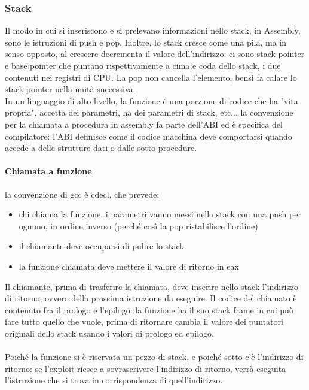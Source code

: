 \documentclass{article}
\begin{document}
\subsubsection{Stack}
Il modo in cui si inseriscono e si prelevano informazioni nello stack, in Assembly, sono le istruzioni di push e pop. Inoltre, lo stack cresce come una pila, ma in senso opposto, al crescere decrementa il valore dell'indirizzo: ci sono stack pointer e base pointer che puntano rispettivamente a cima e coda dello stack, i due contenuti nei registri di CPU. La pop non cancella l'elemento, bensì fa calare lo stack pointer nella unità successiva.\\ In un linguaggio di alto livello, la funzione è una porzione di codice che ha "vita propria", accetta dei parametri, ha dei parametri di stack, etc... la convenzione per la chiamata a procedura in assembly fa parte dell'ABI ed è specifica del compilatore: l'ABI definisce come il codice macchina deve comportarsi quando accede a delle strutture dati o dalle sotto-procedure.
\paragraph{Chiamata a funzione}la convenzione di gcc è cdecl, che prevede:
\begin{itemize}
\item chi chiama la funzione, i parametri vanno messi nello stack con una push per ognuno, in ordine inverso (perché così la pop ristabilisce l'ordine)
\item il chiamante deve occuparsi di pulire lo stack
\item la funzione chiamata deve mettere il valore di ritorno in eax
\end{itemize}
Il chiamante, prima di trasferire la chiamata, deve inserire nello stack l'indirizzo di ritorno, ovvero della prossima istruzione da eseguire. Il codice del chiamato è contenuto fra il prologo e l'epilogo: la funzione ha il suo stack frame in cui può fare tutto quello che vuole, prima di ritornare cambia il valore dei puntatori originali dello stack usando i valori di prologo ed epilogo.\\\\ Poiché la funzione si è riservata un pezzo di stack, e poiché sotto c'è l'indirizzo di ritorno: se l'exploit riesce a sovrascrivere l'indirizzo di ritorno, verrà eseguita l'istruzione che si trova in corrispondenza di quell'indirizzo.
\end{document}

